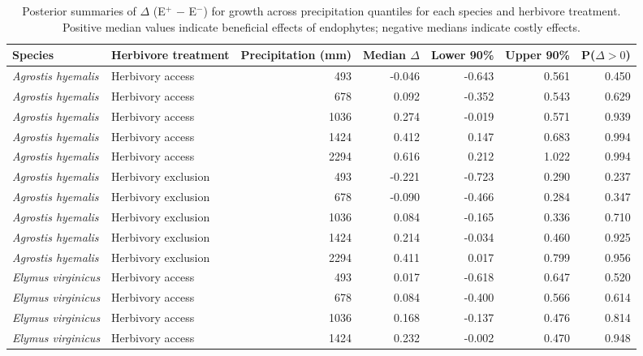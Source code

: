 \documentclass[12pt]{article}\usepackage[]{graphicx}\usepackage[dvipsnames]{xcolor}
\begin{document}
{\begin{landscape}
\begin{table}[ht]
\centering
\small
\caption[Summaries of $\Delta$ (E$^{+}$ $-$ E$^{-}$) for growth across precipitation quantiles]{Posterior summaries of $\Delta$ (E$^{+}$ $-$ E$^{-}$) for growth across precipitation quantiles for each species and herbivore treatment. 
Positive median values indicate beneficial effects of endophytes; negative medians indicate costly effects.}
\label{tab:delta_summary_grow}
\begin{tabular}{llrrrrr}
\hline
\textbf{Species} & \textbf{Herbivore treatment} & \textbf{Precipitation (mm)} & \textbf{Median $\Delta$} & \textbf{Lower 90\%} & \textbf{Upper 90\%} & \textbf{P($\Delta>0$)} \\
\hline
\textit{Agrostis hyemalis} & Herbivory access    & 493  & -0.046 & -0.643 & 0.561 & 0.450 \\
\textit{Agrostis hyemalis} & Herbivory access    & 678  & 0.092  & -0.352 & 0.543 & 0.629 \\
\textit{Agrostis hyemalis} & Herbivory access    & 1036 & 0.274  & -0.019 & 0.571 & 0.939 \\
\textit{Agrostis hyemalis} & Herbivory access    & 1424 & 0.412  & 0.147  & 0.683 & 0.994 \\
\textit{Agrostis hyemalis} & Herbivory access    & 2294 & 0.616  & 0.212  & 1.022 & 0.994 \\
\textit{Agrostis hyemalis} & Herbivory exclusion & 493  & -0.221 & -0.723 & 0.290 & 0.237 \\
\textit{Agrostis hyemalis} & Herbivory exclusion & 678  & -0.090 & -0.466 & 0.284 & 0.347 \\
\textit{Agrostis hyemalis} & Herbivory exclusion & 1036 & 0.084  & -0.165 & 0.336 & 0.710 \\
\textit{Agrostis hyemalis} & Herbivory exclusion & 1424 & 0.214  & -0.034 & 0.460 & 0.925 \\
\textit{Agrostis hyemalis} & Herbivory exclusion & 2294 & 0.411  & 0.017  & 0.799 & 0.956 \\
\textit{Elymus virginicus} & Herbivory access    & 493  & 0.017  & -0.618 & 0.647 & 0.520 \\
\textit{Elymus virginicus} & Herbivory access    & 678  & 0.084  & -0.400 & 0.566 & 0.614 \\
\textit{Elymus virginicus} & Herbivory access    & 1036 & 0.168  & -0.137 & 0.476 & 0.814 \\
\textit{Elymus virginicus} & Herbivory access    & 1424 & 0.232  & -0.002 & 0.470 & 0.948 \\

\end{tabular}
\end{table}
\end{landscape}}
\end{document}
